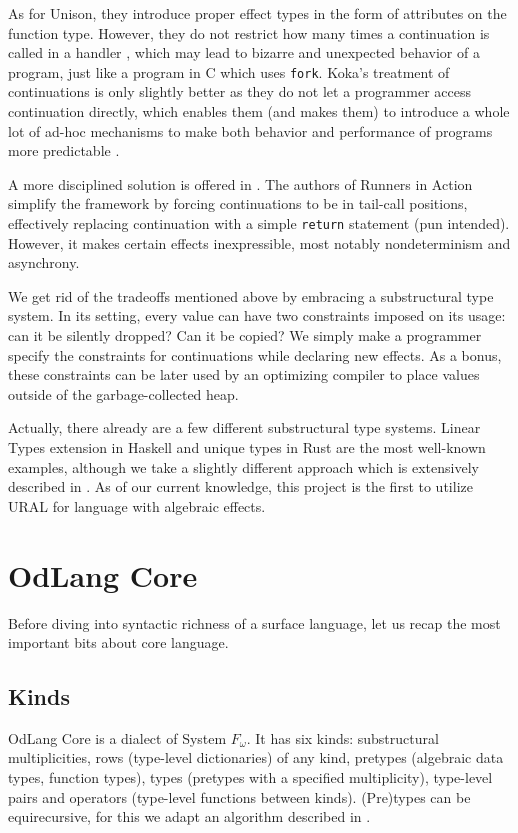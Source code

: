 \documentclass[a4paper,14pt]{extreport}
\begin{document}
As for Unison, they introduce proper effect types in the form of attributes on
the function type. However, they do not restrict how many times a continuation
is called in a handler \cite{unrestricted}, which may lead to bizarre and
unexpected behavior of a program, just like a program in C which uses
\verb|fork|. Koka's treatment of continuations is only slightly better as they
do not let a programmer access continuation directly, which enables them (and
makes them) to introduce a whole lot of ad-hoc mechanisms to make both behavior
and performance of programs more predictable \cite{hidden}.

A more disciplined solution is offered in \cite{bauer}. The authors of Runners
in Action simplify the framework by forcing continuations to be in tail-call
positions, effectively replacing continuation with a simple \verb|return|
statement (pun intended). However, it makes certain effects inexpressible, most
notably nondeterminism and asynchrony.

We get rid of the tradeoffs mentioned above by embracing a substructural type
system. In its setting, every value can have two constraints imposed on its
usage: can it be silently dropped? Can it be copied? We simply make a programmer
specify the constraints for continuations while declaring new effects. As a
bonus, these constraints can be later used by an optimizing compiler to place
values outside of the garbage-collected heap.

Actually, there already are a few different substructural type systems.
Linear Types extension in Haskell \cite{linear} and unique types in Rust
\cite{rust} are the most well-known examples, although we take a slightly
different approach which is extensively described in \cite{ural}. As of our
current knowledge, this project is the first to utilize URAL for language with
algebraic effects.

\chapter{OdLang Core}

Before diving into syntactic richness of a surface language, let us recap the
most important bits about core language.

\section{Kinds}

OdLang Core is a dialect of System $F_\omega$. It has six kinds: substructural
multiplicities, rows (type-level dictionaries) of any kind, pretypes (algebraic
data types, function types), types (pretypes with a specified multiplicity),
type-level pairs and operators (type-level functions between kinds). (Pre)types
can be equirecursive, for this we adapt an algorithm described in \cite{stone}.
\end{document}
